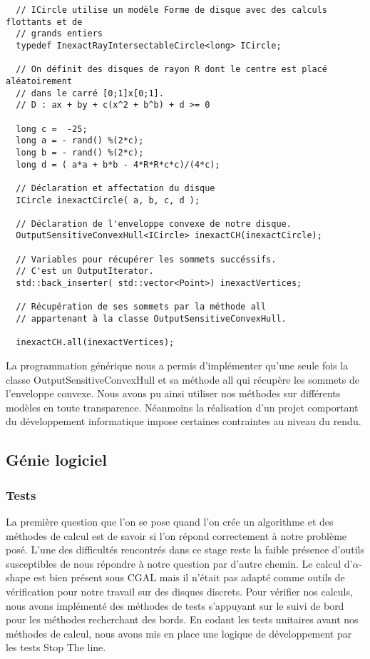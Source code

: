 \begin{verbatim}
  // ICircle utilise un modèle Forme de disque avec des calculs flottants et de 
  // grands entiers 
  typedef InexactRayIntersectableCircle<long> ICircle;
    
  // On définit des disques de rayon R dont le centre est placé aléatoirement
  // dans le carré [0;1]x[0;1].
  // D : ax + by + c(x^2 + b^b) + d >= 0
    
  long c =  -25;
  long a = - rand() %(2*c);
  long b = - rand() %(2*c);  
  long d = ( a*a + b*b - 4*R*R*c*c)/(4*c);
  
  // Déclaration et affectation du disque
  ICircle inexactCircle( a, b, c, d );	  
  
  // Déclaration de l'enveloppe convexe de notre disque.
  OutputSensitiveConvexHull<ICircle> inexactCH(inexactCircle);
  
  // Variables pour récupérer les sommets succéssifs.
  // C'est un OutputIterator.
  std::back_inserter( std::vector<Point>) inexactVertices;
  
  // Récupération de ses sommets par la méthode all 
  // appartenant à la classe OutputSensitiveConvexHull.

  inexactCH.all(inexactVertices); 
\end{verbatim}


La programmation générique nous a permis d'implémenter qu'une seule fois la classe OutputSensitiveConvexHull et sa méthode all qui récupère les sommets de l'enveloppe convexe. Nous avons pu ainsi utiliser nos méthodes sur différents modèles en toute transparence. Néanmoins la réalisation d'un projet comportant du développement informatique impose certaines contraintes au niveau du rendu. 

\subsection{Génie logiciel}

\subsubsection{Tests}

La première question que l'on se pose quand l'on crée un algorithme et des méthodes de calcul est de savoir si l'on répond correctement à notre problème posé. L'une des difficultés rencontrés dans ce stage reste la faible présence d'outils susceptibles de nous répondre à notre question par d'autre chemin. Le calcul d'$\alpha$-shape est bien présent sous CGAL mais il n'était pas adapté comme outils de vérification pour notre travail sur des disques discrets. Pour vérifier nos calculs, nous avons implémenté des méthodes de tests s'appuyant sur le suivi de bord pour les méthodes recherchant des bords. En codant les tests unitaires avant nos méthodes de calcul, nous avons mis en place une logique de développement par les tests Stop The line. \cite{stoptheline}

